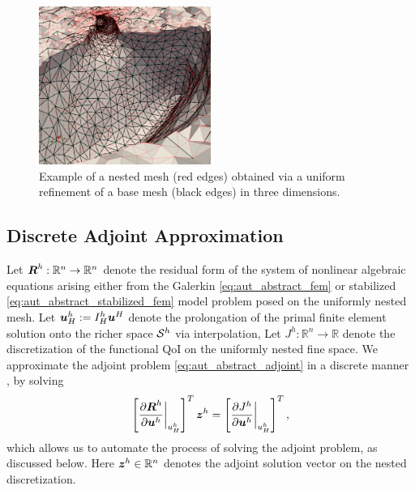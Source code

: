 \begin{figure}[ht!]
\centering
\includegraphics[width=0.5\textwidth]{img/aut_glial_nested}
\caption{Example of a nested mesh (red edges) obtained via a uniform
refinement of a base mesh (black edges) in three dimensions.}
\label{fig:aut_glial_nested}
\end{figure}

\subsection{Discrete Adjoint Approximation}

Let $\bs{R}^h : \mathbb{R}^n \to \mathbb{R}^n$ denote the residual form of
the system of nonlinear algebraic equations arising either from the Galerkin
\eqref{eq:aut_abstract_fem} or stabilized
\eqref{eq:aut_abstract_stabilized_fem}
model problem posed on the uniformly nested mesh. Let $\bs{u}^h_H :=
I^h_H \bs{u}^H$ denote the prolongation of the primal finite element solution
onto the richer space $\S^h$ via interpolation,
Let $J^h : \mathbb{R}^n \to
\mathbb{R}$ denote the discretization of the functional QoI on the
uniformly nested fine space. We approximate the adjoint problem
\eqref{eq:aut_abstract_adjoint} in a discrete manner
\cite{fidkowski2011review, venditti2000adjoint, venditti2002adjoint,
venditti2003adjoint}, by solving
%
\begin{gather}
\left[ \frac{\partial \bs{R}^h}{\partial \bs{u}^h} \biggr|_{u^h_H}
\right]^T \bs{z}^h = \left[ \frac{\partial J^h}{\partial \bs{u}^h}
\biggr|_{u^h_H} \right]^T,
\label{eq:aut_discrete_adjoint}
\end{gather}
%
which allows us to automate the process of solving the adjoint problem, as
discussed below. Here $\bs{z}^h \in \mathbb{R}^n$ denotes the adjoint
solution vector on the nested discretization.

